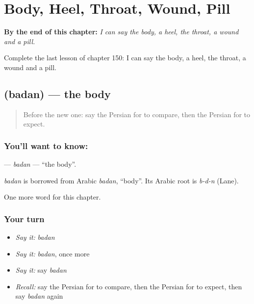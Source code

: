 
\chapter{Body, Heel, Throat, Wound, Pill}
\label{ch:fa-body-heel-throat-wound-pill}

\begin{chapteropening}
\textbf{By the end of this chapter:} \emph{I can say the body, a heel, the throat, a wound and a pill.}

Complete the last lesson of chapter 150: I can say the body, a heel, the throat, a wound and a pill.
\end{chapteropening}

\section[\texorpdfstring{\fa{بدن} (badan)}{بدن (badan)}]{ (badan) — the body}

\label{lesson:FA-C150-badan}



\begin{quote}
Before the new one: say the Persian for to compare, then the Persian for to expect.
\end{quote}

\subsection*{You'll want to know: }
\textbf{} — \emph{badan} — \textquotedblleft{}the body\textquotedblright{}.

\begin{cousinweb}
\emph{badan} is borrowed from Arabic \emph{badan}, \textquotedblleft{}body\textquotedblright{}. Its Arabic root is \emph{b-d-n} (Lane).
\end{cousinweb}

\begin{grammarlens}[title={What you've built}]
One more word for this chapter.
\end{grammarlens}

\subsection*{Your turn}
\begin{itemize}
\raggedright
  \item \emph{Say it:} \emph{badan}
  \item \emph{Say it:} \emph{badan}, once more
  \item \emph{Say it:} say \emph{badan}
  \item \emph{Recall:} say the Persian for to compare, then the Persian for to expect, then say \emph{badan} again
\end{itemize}

